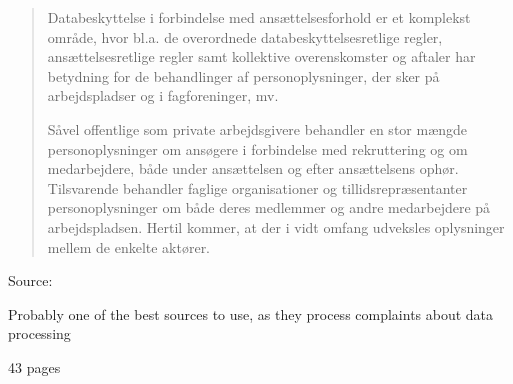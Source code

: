 \documentclass[Screen16to9,17pt]{foils}
\begin{document}


\begin{quote}
Databeskyttelse i forbindelse med ansættelsesforhold er et komplekst område, hvor bl.a. de overordnede databeskyttelsesretlige regler, ansættelsesretlige regler samt kollektive overenskomster og aftaler har betydning for de behandlinger af personoplysninger, der sker på arbejdspladser og i fagforeninger, mv.

Såvel offentlige som private arbejdsgivere behandler en stor mængde personoplysninger om ansøgere i forbindelse med rekruttering og om medarbejdere, både under ansættelsen og efter ansættelsens ophør. Tilsvarende behandler faglige organisationer og tillidsrepræsentanter personoplysninger om både deres medlemmer og andre medarbejdere på arbejdspladsen. Hertil kommer, at der i vidt omfang udveksles oplysninger mellem de enkelte aktører.
\end{quote}
Source: {\footnotesize{}}

\begin{list2}
\item Probably one of the best sources to use, as they process complaints about data processing
\item 43 pages
\end{list2}





\slidenext{}
\end{document}
